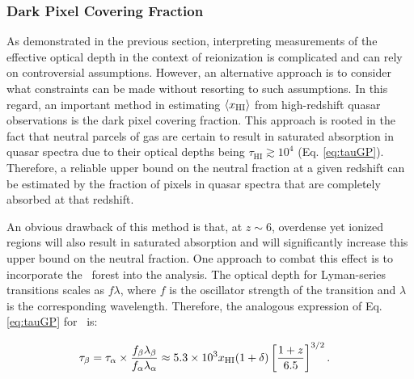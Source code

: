 %
%

\clearpage
\subsubsection{Dark Pixel Covering Fraction}

As demonstrated in the previous section, interpreting measurements of the effective optical depth in the context of reionization is complicated and can rely on controversial assumptions. However, an alternative approach is to consider what constraints can be made without resorting to such assumptions. In this regard, an important method in estimating $\langle x_{\text{HI}}\rangle$ from high-redshift quasar observations is the dark pixel covering fraction. This approach is rooted in the fact that neutral parcels of gas are certain to result in saturated absorption in quasar spectra due to their optical depths being $\tau_{\text{HI}} \gtrsim 10^4$ (Eq. \ref{eq:tauGP}). Therefore, a reliable upper bound on the neutral fraction at a given redshift can be estimated by the fraction of pixels in quasar spectra that are completely absorbed at that redshift. 

An obvious drawback of this method is that, at $z \sim 6$, overdense yet ionized regions will also result in saturated absorption and will significantly increase this upper bound on the neutral fraction. One approach to combat this effect is to incorporate the \lyb\ forest into the analysis. The optical depth for Lyman-series transitions scales as $f\lambda$, where $f$ is the oscillator strength of the transition and $\lambda$ is the corresponding wavelength. Therefore, the analogous expression of Eq. \ref{eq:tauGP} for \lyb\ is:

\begin{align}
\tau_{\beta} &= \tau_{\alpha} \times \dfrac{f_{\beta}\lambda_{\beta}}{f_{\alpha}\lambda_{\alpha}} \approx 5.3 \times 10^{3} x_{\text{HI}} (1 + \delta) \left[\dfrac{1+z}{6.5}\right]^{3/2}. \label{eq:tauGPB}
\end{align}


